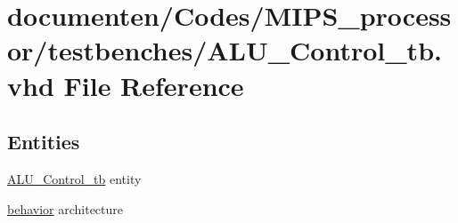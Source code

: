 \hypertarget{_a_l_u___control__tb_8vhd}{\section{documenten/\-Codes/\-M\-I\-P\-S\-\_\-processor/testbenches/\-A\-L\-U\-\_\-\-Control\-\_\-tb.vhd File Reference}
\label{_a_l_u___control__tb_8vhd}
}
\subsection*{Entities}
\begin{DoxyCompactItemize}
\item 
\hyperlink{class_a_l_u___control__tb}{A\-L\-U\-\_\-\-Control\-\_\-tb} entity
\item 
\hyperlink{class_a_l_u___control__tb_1_1behavior}{behavior} architecture
\end{DoxyCompactItemize}
